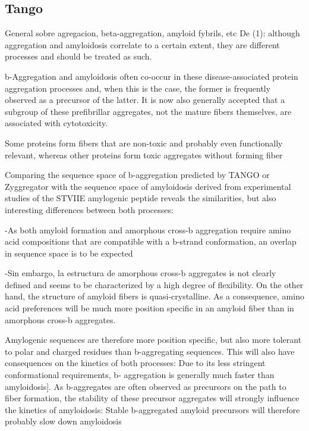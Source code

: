 \subsection{Tango}

General sobre agregacion, beta-aggregation, amyloid fybrils, etc
De (1): although aggregation and amyloidosis correlate to a certain extent, they are different
processes and should be treated as such.

b-Aggregation and amyloidosis often co-occur in these disease-associated protein aggregation processes and, when this is the case, the former is frequently observed as a precursor of the latter. It is now also generally accepted that a subgroup of these prefibrillar
aggregates, not the mature fibers themselves, are associated with cytotoxicity.

Some proteins form fibers that are non-toxic and probably even functionally relevant,
whereas other proteins form toxic aggregates without forming fiber

Comparing the sequence space of b-aggregation predicted by TANGO or Zyggregator with the sequence space of amyloidosis derived from experimental studies of the STVIIE amylogenic peptide reveals the similarities, but also interesting differences between both processes:

-As both amyloid formation and amorphous cross-b aggregation require amino acid compositions that are compatible with a b-strand conformation, an overlap in
sequence space is to be expected

-Sin embargo, la estructura de amorphous cross-b aggregates is not
clearly defined and seems to be characterized by a high degree of flexibility. On the other hand, the structure of amyloid fibers is quasi-crystalline. As a consequence, amino acid preferences will be much more position specific in an amyloid fiber than in amorphous cross-b aggregates.

Amylogenic sequences are therefore more position specific, but also more tolerant to polar and charged residues than b-aggregating sequences. This will also have consequences on the kinetics of both processes: Due to its less stringent conformational requirements, b-
aggregation is generally much faster than amyloidosis]. 
As b-aggregates are often observed as precursors on the path to fiber formation, the stability of these precursor aggregates will strongly influence the kinetics of amyloidosis: Stable b-aggregated amyloid precursors will therefore probably slow down amyloidosis

